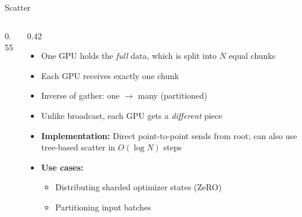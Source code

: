 \begin{frame}{Scatter}
\begin{columns}
\begin{column}{0.55\textwidth}
\begin{center}
      \end{center}
    \end{column}
    \begin{column}{0.42\textwidth}
      \begin{itemize}
        \item One GPU holds the \emph{full} data, which is split into $N$ equal chunks
        \item Each GPU receives exactly one chunk
        \item Inverse of gather: one $\to$ many (partitioned)
        \item Unlike broadcast, each GPU gets a \emph{different} piece
        \item \textbf{Implementation:} Direct point-to-point sends from root; can also use tree-based scatter in $O(\log N)$ steps
        \item \textbf{Use cases:}
          \begin{itemize}
            \item Distributing sharded optimizer states (ZeRO)
            \item Partitioning input batches
          \end{itemize}
      \end{itemize}
    \end{column}
  \end{columns}
\end{frame}

